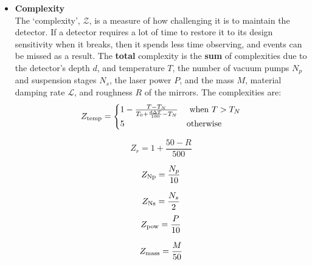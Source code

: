 \documentclass{article}
\begin{document}
\begin{itemize}
\item\textbf{Complexity}\\
The `complexity', $\mathcal{Z}$, is a measure of how challenging it is
to maintain the detector. If a detector requires a lot of time to
restore it to its design sensitivity when it breaks, then it spends
less time observing, and events can be missed as a result. The
\textbf{total} complexity is the \textbf{sum} of complexities due to
the detector's depth $d$, and temperature $T$, the number of vacuum
pumps $N_p$ and suspension stages $N_s$, the laser power $P$, and the
mass $M$, material damping rate $\mathcal{L}$, and roughness $R$ of
the mirrors. The complexities are:
        \begin{equation}Z_{\rm temp} = \begin{cases}
                     1 - \frac{T - T_N}{T_0 + \frac{d\Delta T}{100} - T_N} & \text{ when $T > T_N$} \\
                      5 & \text{otherwise}
                     \end{cases}
        \end{equation}
\begin{multicols}{2}   
        \begin{equation}Z_{r} = 1 + \frac{50 - R}{500}
        \end{equation}
        
        \begin{equation}Z_{\rm Np} = \frac{N_p}{10}
        \end{equation}

        \begin{equation}Z_{\rm Ns} = \frac{N_s}{2}
        \end{equation}
        \break
        \begin{equation}Z_{\rm pow} = \frac{P}{10}
        \end{equation}

        \begin{equation}Z_{\rm mass} = \frac{M}{50}
        \end{equation}
        

\end{multicols}
\end{itemize}
\end{document}
